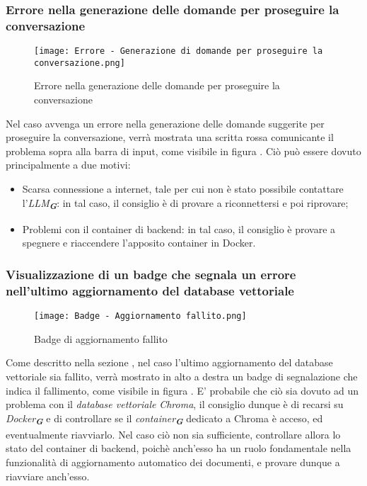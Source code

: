 \subsubsection{Errore nella generazione delle domande per proseguire la conversazione}

\begin{figure}[h]
    \centering
        \texttt{[image: Errore - Generazione di domande per proseguire la conversazione.png]}
        \caption{Errore nella generazione delle domande per proseguire la conversazione}
        \label{fig:Errore nella generazione delle domande per proseguire la conversazione}
\end{figure}

Nel caso avvenga un errore nella generazione delle domande suggerite per proseguire la conversazione, verrà mostrata una scritta rossa comunicante il problema sopra alla barra di input, come visibile in figura . Ciò può essere dovuto principalmente a due motivi:
\begin{itemize}
    \item Scarsa connessione a internet, tale per cui non è stato possibile contattare l'\emph{LLM}\textsubscript{\textbf{\textit{G}}}: in tal caso, il consiglio è di provare a riconnettersi e poi riprovare;
    \item Problemi con il container di backend: in tal caso, il consiglio è provare a spegnere e riaccendere l'apposito container in Docker.
\end{itemize}


\subsubsection{Visualizzazione di un badge che segnala un errore nell'ultimo aggiornamento del database vettoriale}

\begin{figure}[h]
    \centering
        \texttt{[image: Badge - Aggiornamento fallito.png]}
        \caption{Badge di aggiornamento fallito}
        \label{fig:Badge di aggiornamento fallito}
\end{figure}

Come descritto nella sezione , nel caso l'ultimo aggiornamento del database vettoriale sia fallito, verrà mostrato in alto a destra un badge di segnalazione che indica il fallimento, come visibile in figura . E' probabile che ciò sia dovuto ad un problema con il \emph{database vettoriale} \emph{Chroma}, il consiglio dunque è di recarsi su \emph{Docker}\textsubscript{\textbf{\textit{G}}} e di controllare se il \emph{container}\textsubscript{\textbf{\textit{G}}} dedicato a Chroma è acceso, ed eventualmente riavviarlo. Nel caso ciò non sia sufficiente, controllare allora lo stato del container di backend, poichè anch'esso ha un ruolo fondamentale nella funzionalità di aggiornamento automatico dei documenti, e provare dunque a riavviare anch'esso.


